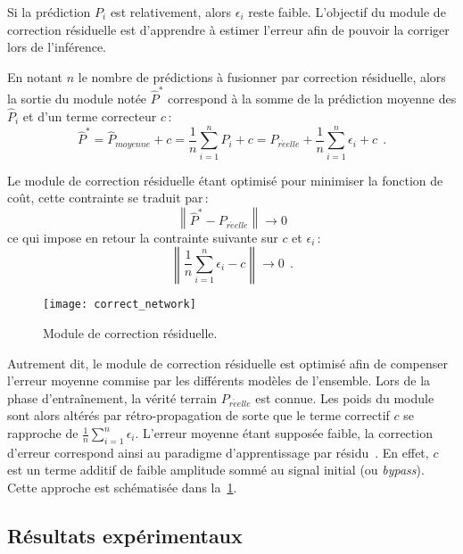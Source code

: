 Si la prédiction $P_i$ est relativement, alors $\epsilon_i$ reste faible. L'objectif du module de correction résiduelle est d'apprendre à estimer l'erreur afin de pouvoir la corriger lors de l'inférence.

En notant $n$ le nombre de prédictions à fusionner par correction résiduelle, alors la sortie du module notée $\hat{P}^*$ correspond à la somme de la prédiction moyenne des $\hat{P}_i$ et d'un terme correcteur $c$\,:
\begin{equation}
\hat{P}^* = \hat{P}_\mathit{moyenne} + c = \frac{1}{n} \sum_{i=1}^n P_i + c = P_\mathit{r\acute{e}elle} + \frac{1}{n} \sum_{i=1}^n \epsilon_i + c~~.
\label{eq:residual_correction}
\end{equation}

Le module de correction résiduelle étant optimisé pour minimiser la fonction de coût, cette contrainte se traduit par\,:
\begin{equation}
\left\lVert \hat{P}^* - P_\mathit{r\acute{e}elle} \right\rVert \rightarrow 0
\end{equation}
ce qui impose en retour la contrainte suivante sur $c$ et $\epsilon_i$\,:
\begin{equation}
\left\lVert \frac{1}{n} \sum_{i=1}^n \epsilon_i - c \right\rVert \rightarrow 0~~.
\end{equation}

\begin{figure}[t]
  \centering
  \texttt{[image: correct\_network]}
  \caption{Module de correction résiduelle.}
  \label{fig:correction_network}
\end{figure}

Autrement dit, le module de correction résiduelle est optimisé afin de compenser l'erreur moyenne commise par les différents modèles de l'ensemble. Lors de la phase d'entraînement, la vérité terrain $P_\mathit{r\acute{e}elle}$ est connue. Les poids du module sont alors altérés par rétro-propagation de sorte que le terme correctif $c$ se rapproche de $\frac{1}{n}\sum_{i=1}^n \epsilon_i$. L'erreur moyenne étant supposée faible, la correction d'erreur correspond ainsi au paradigme d'apprentissage par résidu~\cite{he_deep_2016}. En effet, $c$ est un terme additif de faible amplitude sommé au signal initial (ou \emph{bypass}). Cette approche est schématisée dans la~\cref{fig:correction_network}.

\subsection{Résultats expérimentaux}

